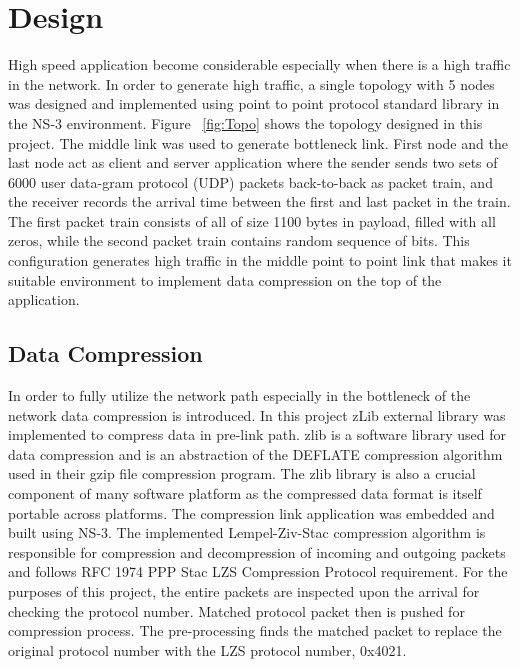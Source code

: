 \documentclass[sigconf]{acmart}
\begin{document}
\section{Design }
High speed application become considerable especially when there is a high traffic in the network. In order to generate high traffic, a single topology 
with 5 nodes was designed and implemented using point to point protocol standard library in the NS-3 environment. Figure ~\ref{fig:Topo} shows the topology designed in this project. 
The middle link was used to generate bottleneck link. First node and the last 
node act as client and server application where the sender sends two sets of 
6000 user data-gram protocol (UDP) packets back-to-back as packet train, and the receiver records the 
arrival time between the first and last packet in the train. The first packet train 
consists of all  of size 1100 bytes in payload, filled with all zeros, while the 
second packet train contains random sequence of bits. This configuration generates high traffic in the middle point to point link that makes it suitable environment to implement data compression on the top of the application.
 

\subsection{Data Compression}

 In order to fully utilize the network path especially in the bottleneck of the network data compression is introduced. In this project zLib external library was implemented to compress data in pre-link path. zlib \cite{Deutsch:1996:ZCD:RFC1950} is a software library used for data compression 
 and is an abstraction of the DEFLATE compression algorithm used in their gzip file compression program. The zlib library is also a crucial component of many software platform as the compressed data format is itself portable across platforms.
The compression link application was embedded and built using NS-3. 
The implemented Lempel-Ziv-Stac \cite{Deutsch:1996:ZCD:RFC1950} compression algorithm is  responsible for 
compression and decompression of incoming and outgoing packets and follows 
RFC 1974 PPP Stac LZS Compression Protocol \cite{Deutsch:1996:ZCD:RFC1950} requirement.
For the purposes of this project, the entire packets are inspected upon the arrival for checking the protocol number.  Matched protocol packet then is pushed for compression process. The pre-processing  finds the matched packet to replace the original protocol number with the LZS protocol number, 0x4021. 
\end{document}
